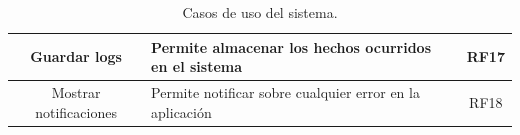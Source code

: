 \begin{table}[!ht]
\begin{tabularx}{\textwidth}{|c|X|c|}
        Guardar logs & Permite almacenar los hechos ocurridos en el sistema & RF17\\\hline
        Mostrar notificaciones & Permite notificar sobre cualquier error en la aplicación & RF18\\\hline
    \end{tabularx}
    \caption{Casos de uso del sistema.}
    \label{tab: rf}
\end{table}

\newpage



